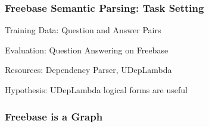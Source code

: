 \documentclass[mathserif,12pt]{beamer}
\newcommand{\hlight}[1]{{\color{blue!80} #1}}
\begin{document}
\begin{frame}
\frametitle{Freebase Semantic Parsing: Task Setting}
\large

\hlight{Training Data:} Question and Answer Pairs

\vspace{2em}
\hlight{Evaluation:} Question Answering on Freebase

\vspace{2em}
\hlight{Resources:} Dependency Parser, UDepLambda

\vspace{2em}
\hlight{Hypothesis}: UDepLambda logical forms are useful
\end{frame}

\begin{frame}
\frametitle{Freebase is a Graph}
\begin{center}

\end{center}
\end{frame}
\end{document}
